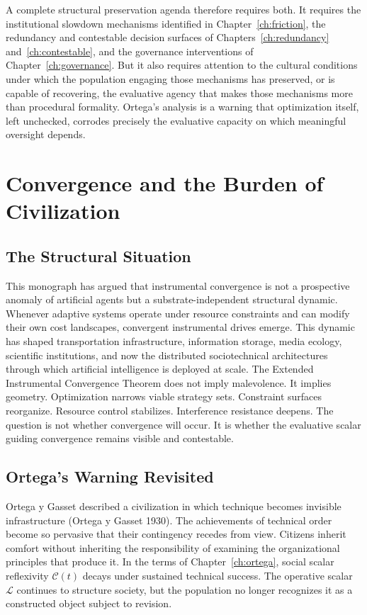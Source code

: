 \documentclass[12pt, oneside]{book}
\theoremstyle{plain}
\theoremstyle{definition}
\theoremstyle{remark}
\theoremstyle{definition}
\begin{document}
A complete structural preservation agenda therefore requires both. It requires the
institutional slowdown mechanisms identified in Chapter~\ref{ch:friction}, the
redundancy and contestable decision surfaces of Chapters~\ref{ch:redundancy}
and~\ref{ch:contestable}, and the governance interventions of
Chapter~\ref{ch:governance}. But it also requires attention to the cultural conditions
under which the population engaging those mechanisms has preserved, or is capable of
recovering, the evaluative agency that makes those mechanisms more than procedural
formality. Ortega's analysis is a warning that optimization itself, left unchecked,
corrodes precisely the evaluative capacity on which meaningful oversight depends.

\chapter{Convergence and the Burden of Civilization}
\label{ch:conclusion}

\section{The Structural Situation}

This monograph has argued that instrumental convergence is not a prospective anomaly
of artificial agents but a substrate-independent structural dynamic. Whenever adaptive
systems operate under resource constraints and can modify their own cost landscapes,
convergent instrumental drives emerge. This dynamic has shaped transportation
infrastructure, information storage, media ecology, scientific institutions, and now
the distributed sociotechnical architectures through which artificial intelligence
is deployed at scale. The Extended Instrumental Convergence Theorem does not imply
malevolence. It implies geometry. Optimization narrows viable strategy sets. Constraint
surfaces reorganize. Resource control stabilizes. Interference resistance deepens.
The question is not whether convergence will occur. It is whether the evaluative
scalar guiding convergence remains visible and contestable.

\section{Ortega's Warning Revisited}

Ortega y Gasset described a civilization in which technique becomes invisible
infrastructure (Ortega y Gasset 1930). The achievements of technical order become
so pervasive that their contingency recedes from view. Citizens inherit comfort
without inheriting the responsibility of examining the organizational principles
that produce it. In the terms of Chapter~\ref{ch:ortega}, social scalar reflexivity
$\mathcal{C}(t)$ decays under sustained technical success. The operative scalar
$\mathcal{L}$ continues to structure society, but the population no longer recognizes
it as a constructed object subject to revision.
\end{document}
